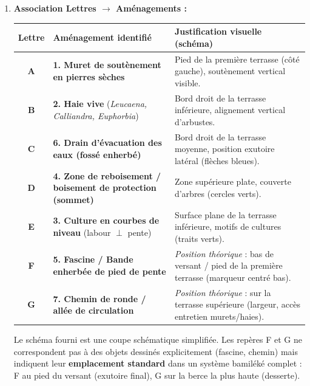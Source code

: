 \documentclass[11pt]{article}
\begin{document}
\begin{corrige}
\begin{enumerate}
    \item \textbf{Association Lettres $\rightarrow$ Aménagements :}
    \begin{center}
    \begin{tabularx}{\linewidth}{|c|X|X|}\hline
    \textbf{Lettre} & \textbf{Aménagement identifié} & \textbf{Justification visuelle (schéma)} \\ \hline
    \textbf{A} & \textbf{1. Muret de soutènement en pierres sèches} & Pied de la première terrasse (côté gauche), soutènement vertical visible. \\ \hline
    \textbf{B} & \textbf{2. Haie vive} (\textit{Leucaena, Calliandra, Euphorbia}) & Bord droit de la terrasse inférieure, alignement vertical d'arbustes. \\ \hline
    \textbf{C} & \textbf{6. Drain d'évacuation des eaux (fossé enherbé)} & Bord droit de la terrasse moyenne, position exutoire latéral (flèches bleues). \\ \hline
    \textbf{D} & \textbf{4. Zone de reboisement / boisement de protection (sommet)} & Zone supérieure plate, couverte d'arbres (cercles verts). \\ \hline
    \textbf{E} & \textbf{3. Culture en courbes de niveau} (labour $\perp$ pente) & Surface plane de la terrasse inférieure, motifs de cultures (traits verts). \\ \hline
    \textbf{F} & \textbf{5. Fascine / Bande enherbée de pied de pente} & \emph{Position théorique} : bas de versant / pied de la première terrasse (marqueur centré bas). \\ \hline
    \textbf{G} & \textbf{7. Chemin de ronde / allée de circulation} & \emph{Position théorique} : sur la terrasse supérieure (largeur, accès entretien murets/haies). \\ \hline
    \end{tabularx}
    \end{center}
    \begin{attention}
    Le schéma fourni est une coupe schématique simplifiée. Les repères F et G ne correspondent pas à des objets dessinés explicitement (fascine, chemin) mais indiquent leur \textbf{emplacement standard} dans un système bamiléké complet : F au pied du versant (exutoire final), G sur la berce la plus haute (desserte).
    \end{attention}


\end{enumerate}
\end{corrige}
\end{document}
